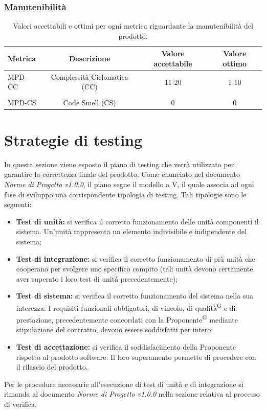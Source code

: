\documentclass[8pt]{article}
\newcommand{\glossterm}[1]{#1\textsuperscript{G}} %
\begin{document}
\subsubsection{Manutenibilità}
\begin{table}[H]	
	\centering
	\begin{tabular}{lccc}
		\toprule
		\textbf{Metrica}& \textbf{Descrizione} & \textbf{Valore accettabile} & \textbf{Valore ottimo} \\
		\midrule
		MPD-CC & Complessità Ciclomatica (CC) & 11-20 & 1-10 \\\\
		MPD-CS & Code Smell (CS) & 0 & 0 \\
		\bottomrule
	\end{tabular}
	\caption{Valori accettabili e ottimi per ogni metrica riguardante la manutenibilità del prodotto.}
	\label{table:Valori accettabili e ottimi per ogni metrica riguardante la manutenibilità del prodotto.}
\end{table}
\clearpage
\section{Strategie di testing}
In questa sezione viene esposto il piano di testing che verrà utilizzato per garantire la correttezza finale del prodotto. Come enunciato nel documento \textit{Norme di Progetto v1.0.0}, il piano segue il modello a V, il quale associa ad ogni fase di sviluppo una corrispondente tipologia di testing. Tali tipologie sono le seguenti:
\begin{itemize}
	\item \textbf{Test di unità:} si verifica il corretto funzionamento delle unità componenti il sistema. Un'unità rappresenta un elemento indivisibile e indipendente del sistema; 
	\item \textbf{Test di integrazione:} si verifica il corretto funzionamento di più unità che cooperano per svolgere uno specifico compito (tali unità devono certamente aver superato i loro test di unità precedentemente);
	\item \textbf{Test di sistema:} si verifica il corretto funzionamento del sistema nella sua interezza. I requisiti funzionali obbligatori, di vincolo, di \glossterm{qualità} e di prestazione, precedentemente concordati con la \glossterm{Proponente} mediante stipulazione del contratto, devono essere soddisfatti per intero;
	\item \textbf{Test di accettazione:} si verifica il soddisfacimento della Proponente rispetto al prodotto software. Il loro superamento permette di procedere con il rilascio del prodotto.
\end{itemize}
Per le procedure necessarie all’esecuzione di test di unità e di integrazione si rimanda al documento \textit{Norme di Progetto v1.0.0} nella sezione relativa al processo di verifica.
\end{document}
